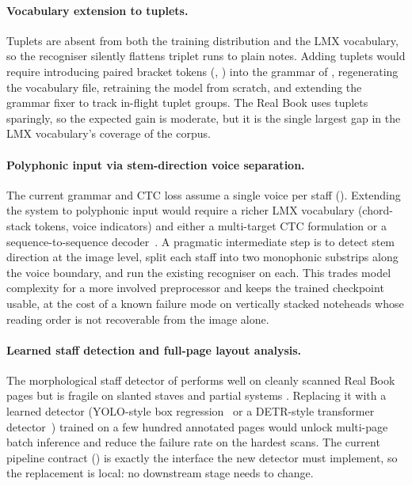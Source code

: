 \paragraph{Vocabulary extension to tuplets.}
Tuplets are absent from both the training distribution and the LMX
vocabulary, so the recogniser silently flattens triplet runs to plain
notes.
Adding tuplets would require introducing paired bracket tokens
(, ) into the grammar of
, regenerating the vocabulary file, retraining
the model from scratch, and extending the grammar fixer to track
in-flight tuplet groups.
The Real Book uses tuplets sparingly, so the expected gain is
moderate, but it is the single largest gap in the LMX vocabulary's
coverage of the corpus.

\paragraph{Polyphonic input via stem-direction voice separation.}
The current grammar and CTC loss assume a single voice per staff
().
Extending the system to polyphonic input would require a richer LMX
vocabulary (chord-stack tokens, voice indicators) and either a
multi-target CTC formulation or a sequence-to-sequence
decoder~\cite{riosVilaSheetMusicTransformer2024}.
A pragmatic intermediate step is to detect stem direction at the
image level, split each staff into two monophonic substrips along the
voice boundary, and run the existing recogniser on each.
This trades model complexity for a more involved preprocessor and
keeps the trained checkpoint usable, at the cost of a known failure
mode on vertically stacked noteheads whose reading order is not
recoverable from the image alone.

\paragraph{Learned staff detection and full-page layout analysis.}
The morphological staff detector of 
performs well on cleanly scanned Real Book pages but is fragile on
slanted staves and partial systems
\cite{simonettaOpticalMusicRecognition2024}.
Replacing it with a learned detector (YOLO-style box
regression~\cite{redmonYouOnlyLook2016} or a DETR-style
transformer detector~\cite{carionEndToEndObjectDetection2020}) trained on a few hundred
annotated pages would unlock multi-page batch inference and reduce the
failure rate on the hardest scans.
The current pipeline contract
() is exactly the interface the new detector
must implement, so the replacement is local: no downstream stage
needs to change.

